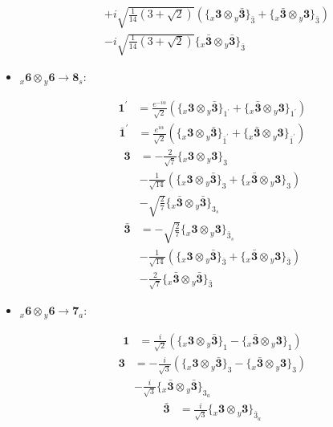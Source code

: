 \documentclass[english]{article}
\newcommand{\rep}[1]{\mathbf{#1}}
\newcommand{\repx}[2]{{}_{#2}\mathbf{#1}}
\newcommand{\tsprodx}[2]{\repx{#1}{x}\otimes\repx{#2}{y}}
\newcommand{\subcgt}[3]{\big\{ \tsprodx{#1}{#2}\big\}^{}_{#3}}
\begin{document}
\begin{itemize}
\begin{fleqn}
\begin{align*}
 & +i \sqrt{\frac{1}{14} \left(3+\sqrt{2}\right)}\left(\subcgt{3}{\bar{3}}{\bar{3}}+\subcgt{\bar{3}}{3}{\bar{3}}\right) \\ 
 & -i \sqrt{\frac{1}{14} \left(3+\sqrt{2}\right)}\subcgt{\bar{3}}{\bar{3}}{\bar{3}}
\end{align*}
\end{fleqn}
\item $\tsprodx{6}{6}\to\rep{8}_{s}$:
\begin{fleqn}
\begin{align*}
\rep{1^{\prime}} & = \frac{e^{-i \alpha }}{\sqrt{2}}\left(\subcgt{3}{\bar{3}}{1^{\prime}}+\subcgt{\bar{3}}{3}{1^{\prime}}\right)
\end{align*}
\begin{align*}
\rep{\bar{1}^{\prime}} & = \frac{e^{i \alpha }}{\sqrt{2}}\left(\subcgt{3}{\bar{3}}{\bar{1}^{\prime}}+\subcgt{\bar{3}}{3}{\bar{1}^{\prime}}\right)
\end{align*}
\begin{align*}
\rep{3} & = -\frac{2}{\sqrt{7}}\subcgt{3}{3}{3} \\ 
 & -\frac{1}{\sqrt{14}}\left(\subcgt{3}{\bar{3}}{3}+\subcgt{\bar{3}}{3}{3}\right) \\ 
 & -\sqrt{\frac{2}{7}}\subcgt{\bar{3}}{\bar{3}}{3_{s}}
\end{align*}
\begin{align*}
\rep{\bar{3}} & = -\sqrt{\frac{2}{7}}\subcgt{3}{3}{\bar{3}_{s}} \\ 
 & -\frac{1}{\sqrt{14}}\left(\subcgt{3}{\bar{3}}{\bar{3}}+\subcgt{\bar{3}}{3}{\bar{3}}\right) \\ 
 & -\frac{2}{\sqrt{7}}\subcgt{\bar{3}}{\bar{3}}{\bar{3}}
\end{align*}
\end{fleqn}
\item $\tsprodx{6}{6}\to\rep{7}_{a}$:
\begin{fleqn}
\begin{align*}
\rep{1} & = \frac{i}{\sqrt{2}}\left(\subcgt{3}{\bar{3}}{1}-\subcgt{\bar{3}}{3}{1}\right)
\end{align*}
\begin{align*}
\rep{3} & = -\frac{i}{\sqrt{3}}\left(\subcgt{3}{\bar{3}}{3}-\subcgt{\bar{3}}{3}{3}\right) \\ 
 & -\frac{i}{\sqrt{3}}\subcgt{\bar{3}}{\bar{3}}{3_{a}}
\end{align*}
\begin{align*}
\rep{\bar{3}} & = \frac{i}{\sqrt{3}}\subcgt{3}{3}{\bar{3}_{a}} \\ 

\end{align*}
\end{fleqn}
\end{itemize}
\end{document}
